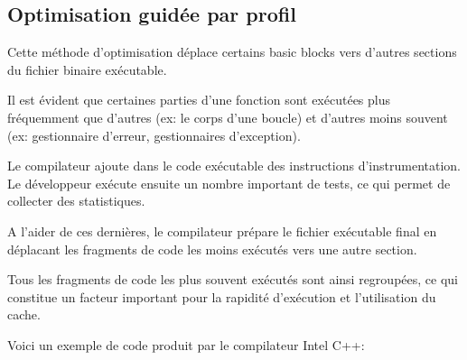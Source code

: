 ﻿


\subsection{Optimisation guidée par profil}
\label{PGO}

\myindex{\oracle}

Cette méthode d'optimisation déplace certains \gls{basic block}s vers d'autres sections du fichier 
binaire exécutable.

Il est évident que certaines parties d'une fonction sont exécutées plus fréquemment que d'autres
(ex: le corps d'une boucle) et d'autres moins souvent (ex: gestionnaire d'erreur, gestionnaires 
d'exception).

Le compilateur ajoute dans le code exécutable des instructions d'instrumentation. Le développeur 
exécute ensuite un nombre important de tests, ce qui permet de collecter des statistiques.

A l'aider de ces dernières, le compilateur prépare le fichier exécutable final en déplacant les 
fragments de code les moins exécutés vers une autre section.

Tous les fragments de code les plus souvent exécutés sont ainsi regroupées, ce qui constitue un 
facteur important pour la rapidité d'exécution et l'utilisation du cache.

Voici un exemple de code \oracle produit par le compilateur Intel C++:

